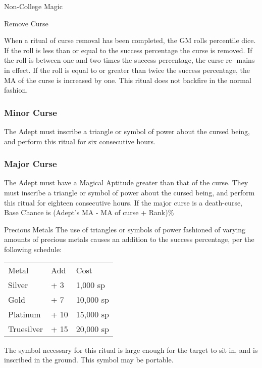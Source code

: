 \begin{Chapter}{Non-College Magic}
\begin{ritual}{Remove Curse}
\begin{effects}
When a ritual of curse removal has been completed, the GM rolls
percentile dice.  If the roll is less than or equal to the success
percentage the curse is removed.  If the roll is between one and two
times the success percentage, the curse re- mains in effect. If the
roll is equal to or greater than twice the success percentage, the MA
of the curse is increased by one. This ritual does not backfire in the
normal fashion.

\subsubsection{Minor Curse}


The Adept must inscribe a triangle or symbol of power about the cursed
being, and perform this ritual for six consecutive hours.

\subsubsection{Major Curse}


The Adept must have a Magical Aptitude greater than that of the
curse. They must inscribe a triangle or symbol of power about the
cursed being, and perform this ritual for eighteen consecutive hours.
If the major curse is a death-curse, Base Chance is (Adept’s MA - MA
of curse + Rank)\%

Precious Metals The use of triangles or symbols of power fashioned of
varying amounts of precious metals causes an addition to the success
percentage, per the following schedule:

\begin{tabularx}{\columnwidth}{lll}
Metal		& Add	& Cost \\
Silver		& + 3	& 1,000 sp \\
Gold		& + 7	& 10,000 sp \\
Platinum	& + 10	& 15,000 sp \\
Truesilver	& + 15	& 20,000 sp \\
\end{tabularx}

The symbol necessary for this ritual is large enough for the target to
sit in, and is inscribed in the ground. This symbol may be portable.
\end{effects}
\end{ritual}

\end{Chapter}
